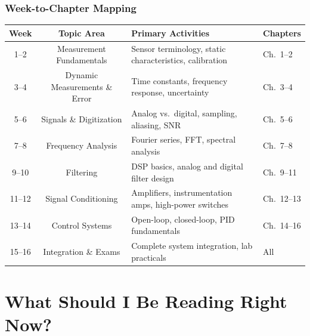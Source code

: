\documentclass[11pt,letterpaper,twoside,openany]{book}
\begin{document}
\subsection*{Week-to-Chapter Mapping}
\begin{table}[htbp]
\centering\small
\begin{tabularx}{\textwidth}{c c X l}
\toprule
\textbf{Week} & \textbf{Topic Area} & \textbf{Primary Activities} & \textbf{Chapters} \\
\midrule
1--2 & Measurement Fundamentals & Sensor terminology, static characteristics, calibration & Ch.~1--2 \\
3--4 & Dynamic Measurements \& Error & Time constants, frequency response, uncertainty & Ch.~3--4 \\
5--6 & Signals \& Digitization & Analog vs.\ digital, sampling, aliasing, SNR & Ch.~5--6 \\
7--8 & Frequency Analysis & Fourier series, FFT, spectral analysis & Ch.~7--8 \\
9--10 & Filtering & DSP basics, analog and digital filter design & Ch.~9--11 \\
11--12 & Signal Conditioning & Amplifiers, instrumentation amps, high-power switches & Ch.~12--13 \\
13--14 & Control Systems & Open-loop, closed-loop, PID fundamentals & Ch.~14--16 \\
15--16 & Integration \& Exams & Complete system integration, lab practicals & All \\
\bottomrule
\end{tabularx}
\end{table}


\newpage
\chapter*{What Should I Be Reading Right Now?}
\end{document}
